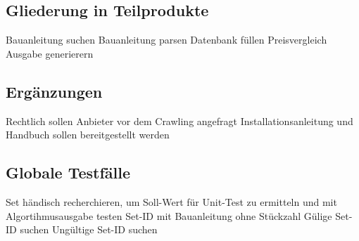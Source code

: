 \subsection{Gliederung in Teilprodukte}
Bauanleitung suchen \newline
Bauanleitung parsen \newline
Datenbank füllen \newline
Preisvergleich \newline
Ausgabe generierern \newline

\subsection{Ergänzungen}
Rechtlich sollen Anbieter vor dem Crawling angefragt \newline
Installationsanleitung und Handbuch sollen bereitgestellt werden \newline

\subsection{Globale Testfälle}
Set händisch recherchieren, um Soll-Wert für Unit-Test zu ermitteln und mit Algortihmusausgabe testen \newline
Set-ID mit Bauanleitung ohne Stückzahl \newline
Gülige Set-ID suchen \newline
Ungültige Set-ID suchen \newline
